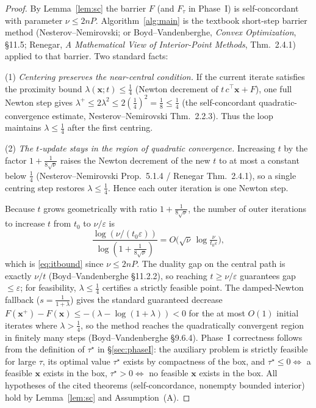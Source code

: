 \documentclass{amsart}
\begin{document}
\begin{proof}
By Lemma~\ref{lem:sc} the barrier $F$ (and $F_\tau$ in Phase~I) is self-concordant
with parameter $\nu\le2nP$. Algorithm~\ref{alg:main} is the textbook short-step
barrier method (Nesterov--Nemirovski; or Boyd--Vandenberghe, \emph{Convex
Optimization}, \S11.5; Renegar, \emph{A Mathematical View of Interior-Point
Methods}, Thm.~2.4.1) applied to that barrier. Two standard facts:

(1) \emph{Centering preserves the near-central condition.} If the current iterate
satisfies the proximity bound $\lambda(\bm x;t)\le\frac14$ (Newton decrement of
$t\,c^{\!\top}\bm x+F$), one full Newton step gives $\lambda^+\le2\lambda^2\le
2(\tfrac14)^2=\tfrac18\le\frac14$ (the self-concordant quadratic-convergence
estimate, Nesterov--Nemirovski Thm.~2.2.3). Thus the loop maintains
$\lambda\le\frac14$ after the first centring.

(2) \emph{The $t$-update stays in the region of quadratic convergence.}
Increasing $t$ by the factor $1+\frac{1}{8\sqrt\nu}$ raises the Newton decrement of
the new $t$ to at most a constant below $\frac14$ (Nesterov--Nemirovski Prop.~5.1.4
/ Renegar Thm.~2.4.1), so a single centring step restores $\lambda\le\frac14$. Hence
each outer iteration is one Newton step.

Because $t$ grows geometrically with ratio $1+\frac1{8\sqrt\nu}$, the number of outer
iterations to increase $t$ from $t_0$ to $\nu/\varepsilon$ is
\[
  \frac{\log(\nu/(t_0\varepsilon))}{\log(1+\tfrac1{8\sqrt\nu})}
  = O\!\big(\sqrt\nu\,\log\tfrac{\nu}{t_0\varepsilon}\big),
\]
which is \eqref{eq:itbound} since $\nu\le2nP$. The duality gap on the central path is
exactly $\nu/t$ (Boyd--Vandenberghe \S11.2.2), so reaching $t\ge\nu/\varepsilon$
guarantees gap $\le\varepsilon$; for feasibility, $\lambda\le\frac14$ certifies a
strictly feasible point. The damped-Newton fallback ($s=\frac1{1+\lambda}$) gives the
standard guaranteed decrease $F(\bm x^+)-F(\bm x)\le-(\lambda-\log(1+\lambda))<0$ for
the at most $O(1)$ initial iterates where $\lambda>\frac14$, so the method reaches the
quadratically convergent region in finitely many steps (Boyd--Vandenberghe \S9.6.4).
Phase~I correctness follows from the definition of $\tau^\star$ in \S\ref{sec:phaseI}:
the auxiliary problem is strictly feasible for large $\tau$, its optimal value
$\tau^\star$ exists by compactness of the box, and $\tau^\star\le0\Leftrightarrow$ a
feasible $\bm x$ exists in the box, $\tau^\star>0\Leftrightarrow$ no feasible $\bm x$
exists in the box. All hypotheses of the cited theorems (self-concordance, nonempty
bounded interior) hold by Lemma~\ref{lem:sc} and Assumption~(A).
\end{proof}
\end{document}

